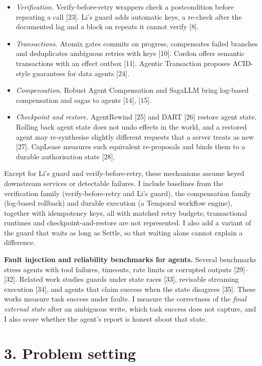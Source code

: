 \documentclass[
  10pt,
]{article}
\providecommand{\tightlist}{%
  \setlength{\itemsep}{0pt}\setlength{\parskip}{0pt}}
\begin{document}
\begin{itemize}
\tightlist
\item
  \emph{Verification.} Verify-before-retry wrappers check a
  postcondition before repeating a call {[}23{]}. Li's guard adds
  automatic keys, a re-check after the documented lag and a block on
  repeats it cannot verify {[}8{]}.
\item
  \emph{Transactions.} Atomix gates commits on progress, compensates
  failed branches and deduplicates ambiguous retries with keys {[}10{]}.
  Cordon offers semantic transactions with an effect outbox {[}11{]}.
  Agentic Transaction proposes ACID-style guarantees for data agents
  {[}24{]}.
\item
  \emph{Compensation.} Robust Agent Compensation and SagaLLM bring
  log-based compensation and sagas to agents {[}14{]}, {[}15{]}.
\item
  \emph{Checkpoint and restore.} AgentRewind {[}25{]} and DART {[}26{]}
  restore agent state. Rolling back agent state does not undo effects in
  the world, and a restored agent may re-synthesise slightly different
  requests that a server treats as new {[}27{]}. CapLease measures such
  equivalent re-proposals and binds them to a durable authorisation
  state {[}28{]}.
\end{itemize}

Except for Li's guard and verify-before-retry, these mechanisms assume
keyed downstream services or detectable failures. I include baselines
from the verification family (verify-before-retry and Li's guard), the
compensation family (log-based rollback) and durable execution (a
Temporal workflow engine), together with idempotency keys, all with
matched retry budgets; transactional runtimes and checkpoint-and-restore
are not represented. I also add a variant of the guard that waits as
long as Settle, so that waiting alone cannot explain a difference.

\textbf{Fault injection and reliability benchmarks for agents.} Several
benchmarks stress agents with tool failures, timeouts, rate limits or
corrupted outputs {[}29{]}--{[}32{]}. Related work studies guards under
state races {[}33{]}, revisable streaming execution {[}34{]}, and agents
that claim success when the state disagrees {[}35{]}. These works
measure task success under faults. I measure the correctness of the
\emph{final external state} after an ambiguous write, which task success
does not capture, and I also score whether the agent's report is honest
about that state.

\hypertarget{problem-setting}{%
\section*{3. Problem setting}\label{problem-setting}}
\end{document}
